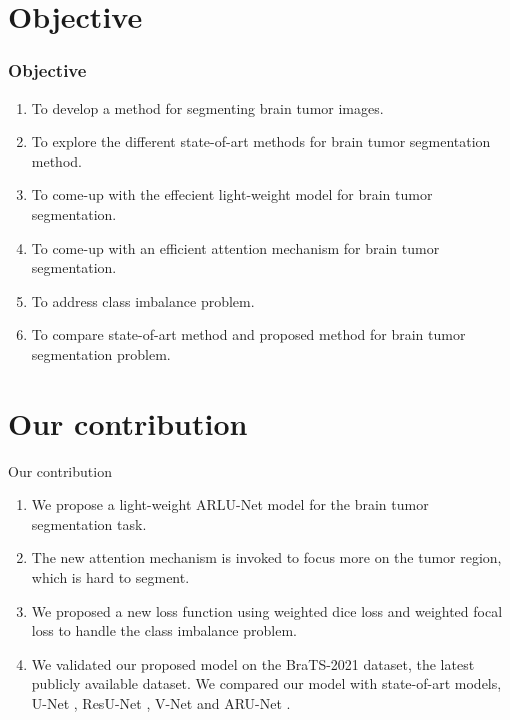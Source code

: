 \documentclass [xcolor=svgnames, t] {beamer}
\begin{document}
\section{Objective}
\begin{frame}\frametitle{Objective}
\centering
\begin{center}
\vspace*{\fill}
\begin{enumerate}
\justifying
    \item To develop a method for segmenting brain tumor images.
    \item To explore the different state-of-art methods for brain tumor segmentation method.
    \item To come-up with the effecient light-weight model for brain tumor segmentation.
    \item To come-up with an efficient attention mechanism for brain tumor segmentation.
    \item To address class imbalance problem.
    \item To compare state-of-art method and proposed method for brain tumor segmentation problem.
\end{enumerate}
\vspace*{\fill}
\end{center}
\end{frame}

\section{Our contribution}
\begin{frame}{Our contribution}
\begin{center}
\vspace*{\fill}
\begin{enumerate}
\justifying
    \item We propose a light-weight ARLU-Net model for the brain tumor segmentation task. 
    \item The new attention mechanism is invoked to focus more on the tumor region, which is hard to segment. 
    \item We proposed a new loss function using weighted dice loss and weighted focal loss to handle the class imbalance problem.
    \item We validated our proposed model on the BraTS-2021 dataset, the latest publicly available dataset. We compared our model with state-of-art models, U-Net \cite{10.1007/978-3-319-24574-4_28}, ResU-Net \cite{SHEHAB2021404}, V-Net \cite{Milletari2016VNetFC} and ARU-Net \cite{MAJI2022103077}. 
\end{enumerate}

\vspace*{\fill}
\end{center}
\end{frame}
\end{document}
